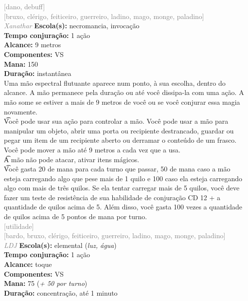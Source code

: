 \documentclass{RPG_Adventure}[2021/10/20]
\begin{document}
{\scriptsize \textcolor{gray}{[dano, debuff]\\}}
{\scriptsize \textcolor{gray}{[bruxo, clérigo, feiticeiro, guerreiro, ladino, mago, monge, paladino]\\}}
{\tiny \textcolor{gray}{\textit{Xanathar}}}
{\small \t \textbf{Escola(s):} necromancia, invocação\\\t \textbf{Tempo conjuração:} 1 ação\\\t \textbf{Alcance:} 9 metros\\\t \textbf{Componentes:} VS\\\t \textbf{Mana:} 150\\\t \textbf{Duração:} instantânea\\}
{\normalsize Uma mão espectral flutuante aparece num ponto, à sua escolha, dentro do alcance. A mão permanece pela duração ou até você dissipa-la com uma ação. A mão some se estiver a mais de 9 metros de você ou se você conjurar essa magia novamente.\\\t Você pode usar sua ação para controlar a mão. Você pode usar a mão para manipular um objeto, abrir uma porta ou recipiente destrancado, guardar ou pegar um item de um recipiente aberto ou derramar o conteúdo de um frasco. Você pode mover a mão até 9 metros a cada vez que a usa.\\\t A mão não pode atacar, ativar itens mágicos.\\\t Você gasta 20 de mana para cada turno que passar, 50 de mana caso a mão esteja carregando algo que pese mais de 1 quilo e 100 caso ela esteja carregando algo com mais de três quilos. Se ela tentar carregar mais de 5 quilos, você deve fazer um teste de resistência de sua habilidade de conjuração CD 12 + a quantidade de quilos acima de 5. Além disso, você gasta 100 vezes a quantidade de quilos acima de 5 pontos de mana por turno.\\}
{\scriptsize \textcolor{gray}{[utilidade]\\}}
{\scriptsize \textcolor{gray}{[bardo, bruxo, clérigo, feiticeiro, guerreiro, ladino, mago, monge, paladino]\\}}
{\tiny \textcolor{gray}{\textit{LDJ}}}
{\small \t \textbf{Escola(s):} elemental (\textit{luz, água})\\\t \textbf{Tempo conjuração:} 1 ação\\\t \textbf{Alcance:} toque\\\t \textbf{Componentes:} VS\\\t \textbf{Mana:} 75 (\textit{+ 50 por turno})\\\t \textbf{Duração:} concentração, até 1 minuto\\}
\end{document}

